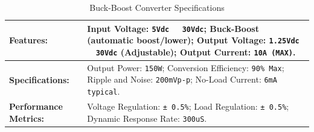 \documentclass[../../main]{subfiles}
\begin{document}

\begin{table}[htbp]
    \centering
    \begin{tabular}{|>{\bfseries}l|p{10cm}|} %
    \hline
    Features: & 
    Input Voltage: \texttt{5Vdc ~ 30Vdc}; 
    Buck-Boost (automatic boost/lower); 
    Output Voltage: \texttt{1.25Vdc ~ 30Vdc} (Adjustable); 
    Output Current: \texttt{10A (MAX)}. \\ \hline
    Specifications: & 
    Output Power: \texttt{150W}; 
    Conversion Efficiency: \texttt{90\% Max}; 
    Ripple and Noise: \texttt{200mVp-p}; 
    No-Load Current: \texttt{6mA typical}. \\ \hline
    Performance Metrics: & 
    Voltage Regulation: \texttt{± 0.5\%}; 
    Load Regulation: \texttt{± 0.5\%}; 
    Dynamic Response Rate: \texttt{300uS}. \\ \hline
    \end{tabular}
    \caption{Buck-Boost Converter Specifications}
    \label{Linear actuator booster specifications} %
    \end{table}
\end{document}
